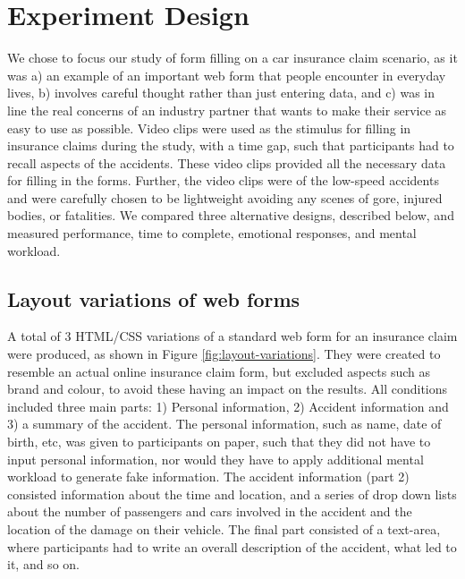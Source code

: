 \documentclass[../main/Feedback.tex]{subfiles}
\begin{document}
\section{Experiment Design}
We chose to focus our study of form filling on a car insurance claim scenario, as it was a) an example of an important web form that people encounter in everyday lives, b) involves careful thought rather than just entering data, and c) was in line the real concerns of an industry partner that wants to make their service as easy to use as possible. Video clips were used as the stimulus for filling in insurance claims during the study,  with a time gap, such that participants had to recall aspects of the accidents. These video clips provided all the necessary data for filling in the forms.
Further, the video clips were of the low-speed accidents and were carefully chosen to be lightweight avoiding any scenes of gore, injured bodies, or fatalities. We compared three alternative designs, described below, and measured performance, time to complete, emotional responses, and mental workload.

\subsection{Layout variations of web forms}
A total of 3 HTML/CSS variations of a standard web form for an insurance claim were produced, as shown in Figure \ref{fig:layout-variations}.
They were created to resemble an actual online insurance claim form, but excluded aspects such as brand and colour, to avoid these having an impact on the results.
All conditions included three main parts: 1) Personal information, 2) Accident information and 3) a summary of the accident.
The personal information, such as name, date of birth, etc, was given to participants on paper, such that they did not have to input personal information, nor would they have to apply additional mental workload to generate fake information.
The accident information (part 2) consisted information about the time and location, and a series of drop down lists about the number of passengers and cars involved in the accident and the location of the damage on their vehicle.
The final part consisted of a text-area, where participants had to write an overall description of the accident, what led to it, and so on. 
\end{document}
